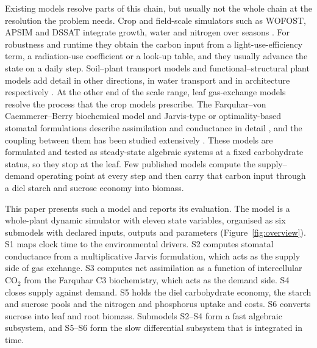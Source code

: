 Existing models resolve parts of this chain, but usually not the whole chain at
the resolution the problem needs. Crop and field-scale simulators such as
WOFOST, APSIM and DSSAT integrate growth, water and nitrogen over seasons
\cite{deWit2019,Holzworth2014,Jones2003}. For robustness and runtime they
obtain the carbon input from a light-use-efficiency term, a radiation-use
coefficient or a look-up table, and they usually advance the state on a daily
step. Soil--plant transport models and functional--structural plant models add
detail in other directions, in water transport and in architecture
respectively \cite{Janott2011,DeReffye2020,Louarn2020}. At the other end of
the scale range, leaf gas-exchange models resolve the process that the crop
models prescribe. The Farquhar--von Caemmerer--Berry biochemical model and
Jarvis-type or optimality-based stomatal formulations describe assimilation and
conductance in detail \cite{Farquhar1980,Jarvis1976,Ball1987,Medlyn2011}, and
the coupling between them has been studied extensively
\cite{Damour2010,Buckley2017}. These models are formulated and tested as
steady-state algebraic systems at a fixed carbohydrate status, so they stop at
the leaf. Few published models compute the supply--demand operating point at
every step and then carry that carbon input through a diel starch and sucrose
economy into biomass.

This paper presents such a model and reports its evaluation. The model is a
whole-plant dynamic simulator with eleven state variables, organised as six
submodels with declared inputs, outputs and parameters
(Figure~\ref{fig:overview}). S1 maps clock time to
the environmental drivers. S2 computes stomatal conductance from a
multiplicative Jarvis formulation, which acts as the supply side of gas
exchange. S3 computes net assimilation as a function of intercellular CO$_2$
from the Farquhar C3 biochemistry, which acts as the demand side. S4 closes
supply against demand. S5 holds the diel carbohydrate economy, the starch and
sucrose pools and the nitrogen and phosphorus uptake and costs. S6 converts
sucrose into leaf and root biomass. Submodels S2--S4 form a fast algebraic
subsystem, and S5--S6 form the slow differential subsystem that is integrated
in time.

